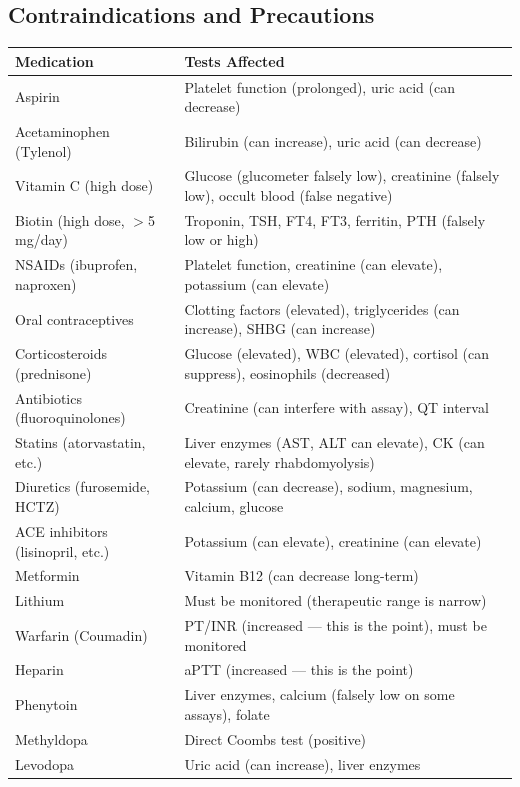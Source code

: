 \subsection{Contraindications and Precautions}

\begin{longtable}{@{}p{4.5cm}p{10.5cm}@{}}
\toprule
\textbf{Medication} & \textbf{Tests Affected} \\
\midrule
Aspirin & Platelet function (prolonged), uric acid (can decrease) \\
Acetaminophen (Tylenol) & Bilirubin (can increase), uric acid (can decrease) \\
Vitamin C (high dose) & Glucose (glucometer falsely low), creatinine (falsely low), occult blood (false negative) \\
Biotin (high dose, $>$5 mg/day) & Troponin, TSH, FT4, FT3, ferritin, PTH (falsely low or high) \\
NSAIDs (ibuprofen, naproxen) & Platelet function, creatinine (can elevate), potassium (can elevate) \\
Oral contraceptives & Clotting factors (elevated), triglycerides (can increase), SHBG (can increase) \\
Corticosteroids (prednisone) & Glucose (elevated), WBC (elevated), cortisol (can suppress), eosinophils (decreased) \\
Antibiotics (fluoroquinolones) & Creatinine (can interfere with assay), QT interval \\
Statins (atorvastatin, etc.) & Liver enzymes (AST, ALT can elevate), CK (can elevate, rarely rhabdomyolysis) \\
Diuretics (furosemide, HCTZ) & Potassium (can decrease), sodium, magnesium, calcium, glucose \\
ACE inhibitors (lisinopril, etc.) & Potassium (can elevate), creatinine (can elevate) \\
Metformin & Vitamin B12 (can decrease long-term) \\
Lithium & Must be monitored (therapeutic range is narrow) \\
Warfarin (Coumadin) & PT/INR (increased --- this is the point), must be monitored \\
Heparin & aPTT (increased --- this is the point) \\
Phenytoin & Liver enzymes, calcium (falsely low on some assays), folate \\
Methyldopa & Direct Coombs test (positive) \\
Levodopa & Uric acid (can increase), liver enzymes \\
\bottomrule
\end{longtable}

